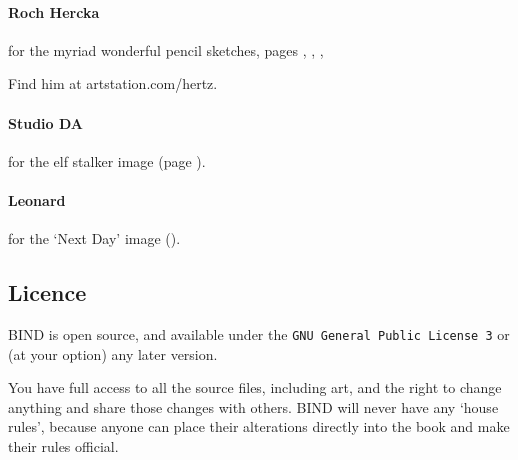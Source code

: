 \begin{multicols}{2}
\paragraph{Roch Hercka} for the myriad wonderful pencil sketches, pages 
\pageref{Roch_Hercka/five_races}, 
\pageref{Roch_Hercka/xp-1}, 
\pageref{Roch_Hercka/xp-2}, 

Find him at artstation.com/hertz.

\paragraph{Studio DA}
for the elf stalker image
(page \pageref{Studio_DA/elf_stalker}).

\paragraph{Leonard}
for the `Next Day' image ().

\subsection*{Licence}

BIND is open source, and available under the {\tt GNU General Public License 3} or (at your option) any later version.

You have full access to all the source files, including art, and the right to change anything and share those changes with others.
BIND will never have any `house rules', because anyone can place their alterations directly into the book and make their rules official.

\end{multicols}
